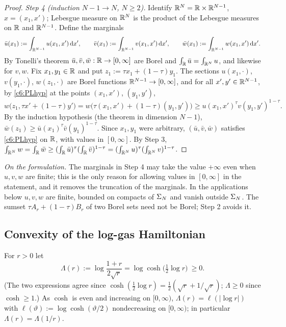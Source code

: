 \begin{proof}
\emph{Step 4 (induction $N-1\to N$, $N\ge2$).}
Identify $\mathbb{R}^N=\mathbb{R}\times\mathbb{R}^{N-1}$, $x=(x_1,x')$; Lebesgue measure on $\mathbb{R}^N$ is the product of the Lebesgue measures on $\mathbb{R}$ and $\mathbb{R}^{N-1}$. Define the marginals
\[\bar u(x_1):=\int_{\mathbb{R}^{N-1}}u(x_1,x')\,\mathrm{d} x',\qquad\bar v(x_1):=\int_{\mathbb{R}^{N-1}}v(x_1,x')\,\mathrm{d} x',\qquad\bar w(x_1):=\int_{\mathbb{R}^{N-1}}w(x_1,x')\,\mathrm{d} x' .\]
By Tonelli's theorem $\bar u,\bar v,\bar w:\mathbb{R}\to[0,\infty]$ are Borel and $\int_{\mathbb{R}}\bar u=\int_{\mathbb{R}^N}u$, and likewise for $v,w$.
Fix $x_1,y_1\in\mathbb{R}$ and put $z_1:=\tau x_1+(1-\tau)y_1$. The sections $u(x_1,\cdot)$, $v(y_1,\cdot)$, $w(z_1,\cdot)$ are Borel functions $\mathbb{R}^{N-1}\to[0,\infty]$, and for all $x',y'\in\mathbb{R}^{N-1}$, by \eqref{c6:PLhyp} at the points $(x_1,x')$, $(y_1,y')$,
\[w\big(z_1,\tau x'+(1-\tau)y'\big)=w\big(\tau(x_1,x')+(1-\tau)(y_1,y')\big)\ge u(x_1,x')^\tau v(y_1,y')^{1-\tau}.\]
By the induction hypothesis (the theorem in dimension $N-1$), $\bar w(z_1)\ge\bar u(x_1)^\tau\bar v(y_1)^{1-\tau}$.
Since $x_1,y_1$ were arbitrary, $(\bar u,\bar v,\bar w)$ satisfies \eqref{c6:PLhyp} on $\mathbb{R}$, with values in $[0,\infty]$. By Step 3,
$\int_{\mathbb{R}^N}w=\int_{\mathbb{R}}\bar w\ge(\int_{\mathbb{R}}\bar u)^\tau(\int_{\mathbb{R}}\bar v)^{1-\tau}=(\int_{\mathbb{R}^N}u)^\tau(\int_{\mathbb{R}^N}v)^{1-\tau}$.
\end{proof}

\smallskip\noindent\emph{On the formulation.}
The marginals in Step 4 may take the value $+\infty$ even when $u,v,w$ are finite; this is the only reason for allowing values in $[0,\infty]$ in the statement, and it removes the truncation of the marginals. In the applications below $u,v,w$ are finite, bounded on compacts of $\Sigma_N$ and vanish outside $\Sigma_N$.
The sumset $\tau A_r+(1-\tau)B_r$ of two Borel sets need not be Borel; Step 2 avoids it.

\subsection{Convexity of the log-gas Hamiltonian}

For $r>0$ let
\begin{equation}\label{c6:defLambda}
\Lambda(r):=\log\frac{1+r}{2\sqrt r}=\log\cosh\big(\tfrac12\log r\big)\ \ge0 .
\end{equation}
(The two expressions agree since $\cosh(\frac12\log r)=\frac12(\sqrt r+1/\sqrt r)$; $\Lambda\ge0$ since $\cosh\ge1$.)
As $\cosh$ is even and increasing on $[0,\infty)$, $\Lambda(r)=\ell(|\log r|)$ with $\ell(\vartheta):=\log\cosh(\vartheta/2)$ nondecreasing on $[0,\infty)$; in particular $\Lambda(r)=\Lambda(1/r)$.

